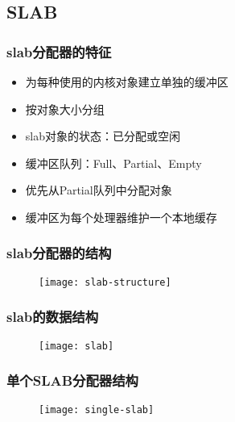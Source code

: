\subsection{SLAB} %
\begin{frame}[plain,t]    
    \frametitle{slab分配器的特征}
    \begin{itemize}
        \item 为每种使用的内核对象建立单独的缓冲区
        \item 按对象大小分组
        \item slab对象的状态：已分配或空闲
        \item 缓冲区队列：Full、Partial、Empty
        \item 优先从Partial队列中分配对象
        \item 缓冲区为每个处理器维护一个本地缓存
    \end{itemize}
\end{frame}
\begin{frame}[plain,t]    
    \frametitle{slab分配器的结构}
    \begin{figure}
        \centering
        \texttt{[image: slab-structure]}
    \end{figure}
\end{frame}
\begin{frame}[plain,t]    
    \frametitle{slab的数据结构}
    \begin{figure}
        \centering
        \texttt{[image: slab]}
    \end{figure}
\end{frame}
\begin{frame}[plain,t]    
    \frametitle{单个SLAB分配器结构}
    \begin{figure}
        \centering
        \texttt{[image: single-slab]}
    \end{figure}
\end{frame}
